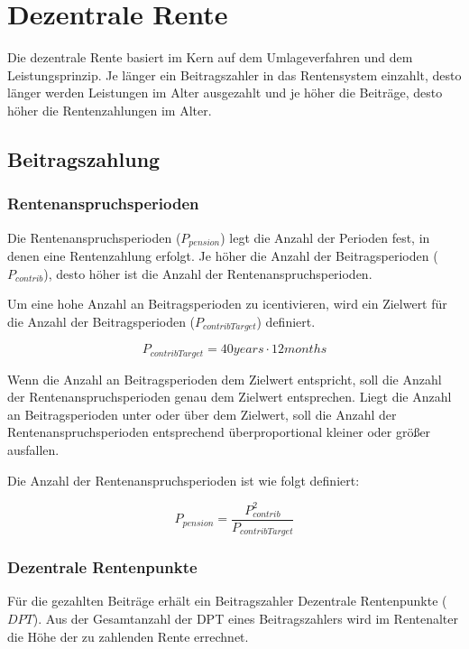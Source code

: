 \section{Dezentrale Rente}

Die dezentrale Rente basiert im Kern auf dem Umlageverfahren und dem
Leistungsprinzip. Je länger ein Beitragszahler in das Rentensystem einzahlt, 
desto länger werden Leistungen im Alter ausgezahlt und je höher die Beiträge,
desto höher die Rentenzahlungen im Alter.

\subsection{Beitragszahlung}

\subsubsection*{Rentenanspruchsperioden}

Die Rentenanspruchsperioden ($P_{pension}$) legt die Anzahl der Perioden fest,
in denen eine Rentenzahlung erfolgt. Je höher die Anzahl der Beitragsperioden
($P_{contrib}$), desto höher ist die Anzahl der Rentenanspruchsperioden.

Um eine hohe Anzahl an Beitragsperioden zu icentivieren, wird ein Zielwert 
für die Anzahl der Beitragsperioden ($P_{contribTarget}$) definiert. 

\begin{equation}
	P_{contribTarget} = 40 years \cdot 12 months
\end{equation}

Wenn die Anzahl an Beitragsperioden dem Zielwert entspricht, soll die Anzahl der 
Rentenanspruchsperioden genau dem Zielwert entsprechen. Liegt die  Anzahl an
Beitragsperioden unter oder über dem Zielwert, soll die Anzahl der 
Rentenanspruchsperioden entsprechend überproportional kleiner oder größer ausfallen.  

Die Anzahl der Rentenanspruchsperioden ist wie folgt definiert:

\begin{equation}
	P_{pension} = \frac{P_{contrib}^2}{P_{contribTarget}}
\end{equation}


\subsubsection*{Dezentrale Rentenpunkte}

Für die gezahlten Beiträge erhält ein Beitragszahler Dezentrale Rentenpunkte
($DPT$). Aus der Gesamtanzahl der DPT eines Beitragszahlers wird im Rentenalter
die Höhe der zu zahlenden Rente errechnet.

